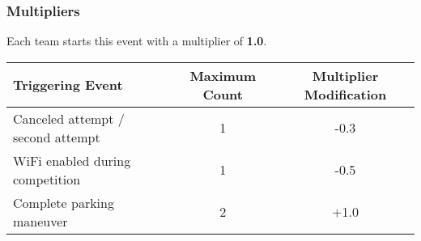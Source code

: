 \subsubsection{Multipliers}
\label{freedrive_multipliers}

Each team starts this event with a multiplier of \textbf{1.0}.

\begin{table}[H]
	\begin{tabular}{@{}lcc@{}}
		\toprule
		\textbf{Triggering Event}         & \textbf{Maximum Count} & \textbf{Multiplier Modification} \\ \midrule
		Canceled attempt / second attempt & 1                      & -0.3                             \\
		WiFi enabled during competition   & 1                      & -0.5                             \\
		Complete parking maneuver         & 2                      & +1.0                             \\
		\bottomrule
	\end{tabular}
\end{table}